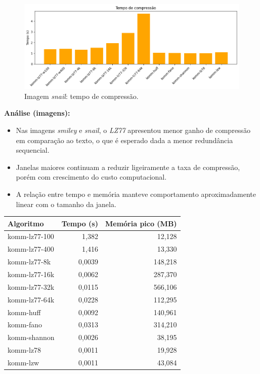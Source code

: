 \begin{figure}[htp]
  \centering
  \caption{Imagem \textit{snail}: tempo de compressão.}
  \label{fig:komm-snail-time}
  \includegraphics[width=15cm]{figuras/komm_snail_time.png}
\end{figure}

\noindent\textbf{Análise (imagens):}
\begin{itemize}
  \item Nas imagens \textit{smiley} e \textit{snail}, o \textit{LZ77} apresentou menor ganho de compressão em comparação ao texto, o que é esperado dada a menor redundância sequencial.
  \item Janelas maiores continuam a reduzir ligeiramente a taxa de compressão, porém com crescimento do custo computacional.
  \item A relação entre tempo e memória manteve comportamento aproximadamente linear com o tamanho da janela.
\end{itemize}

\begin{quadro}[ht]
\caption{Resumo de tempo e memória na compressão da imagem \textit{smiley} (implementações na \textit{Komm}).}
\label{quadro:resultados-komm-smiley}
\begin{tabular}{|l|r|r|}
    \hline
    \textbf{Algoritmo} & \textbf{Tempo (s)} & \textbf{Memória pico (MB)} \\ \hline
    komm-lz77-100   & 1,382 & 12,128  \\ \hline
    komm-lz77-400   & 1,416 & 13,330  \\ \hline
    komm-lz77-8k   & 0,0039 & 148,218  \\ \hline
    komm-lz77-16k  & 0,0062 & 287,370  \\ \hline
    komm-lz77-32k  & 0,0115 & 566,106  \\ \hline
    komm-lz77-64k  & 0,0228 & 112,295  \\ \hline
    komm-huff      & 0,0092 & 140,961  \\ \hline
    komm-fano      & 0,0313 & 314,210  \\ \hline
    komm-shannon   & 0,0026 & 38,195   \\ \hline
    komm-lz78      & 0,0011 & 19,928   \\ \hline
    komm-lzw       & 0,0011 & 43,084   \\ \hline
\end{tabular}
\end{quadro}

